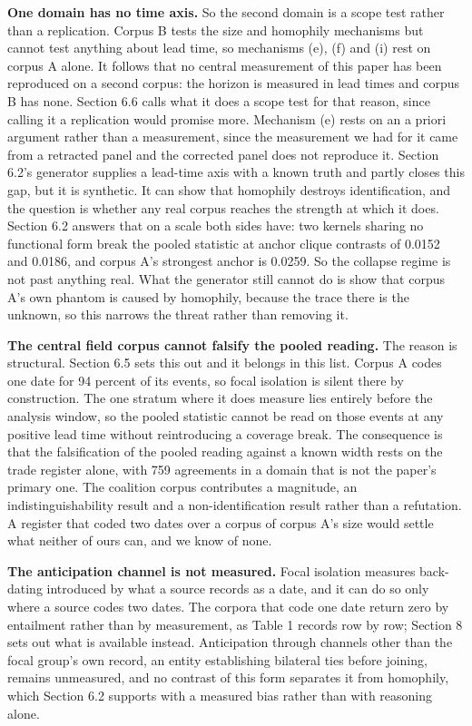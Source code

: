 \documentclass[twoside,11pt]{article}
\begin{document}
\textbf{One domain has no time axis.} So the second domain is a scope test rather than a replication. Corpus B tests the size and homophily mechanisms but cannot test anything about lead time, so mechanisms (e), (f) and (i) rest on corpus A alone. It follows that no central measurement of this paper has been reproduced on a second corpus: the horizon is measured in lead times and corpus B has none. Section 6.6 calls what it does a scope test for that reason, since calling it a replication would promise more. Mechanism (e) rests on an a priori argument rather than a measurement, since the measurement we had for it came from a retracted panel and the corrected panel does not reproduce it. Section 6.2's generator supplies a lead-time axis with a known truth and partly closes this gap, but it is synthetic. It can show that homophily destroys identification, and the question is whether any real corpus reaches the strength at which it does. Section 6.2 answers that on a scale both sides have: two kernels sharing no functional form break the pooled statistic at anchor clique contrasts of 0.0152 and 0.0186, and corpus A's strongest anchor is 0.0259. So the collapse regime is not past anything real. What the generator still cannot do is show that corpus A's own phantom is caused by homophily, because the trace there is the unknown, so this narrows the threat rather than removing it.

\textbf{The central field corpus cannot falsify the pooled reading.} The reason is structural. Section 6.5 sets this out and it belongs in this list. Corpus A codes one date for 94 percent of its events, so focal isolation is silent there by construction. The one stratum where it does measure lies entirely before the analysis window, so the pooled statistic cannot be read on those events at any positive lead time without reintroducing a coverage break. The consequence is that the falsification of the pooled reading against a known width rests on the trade register alone, with 759 agreements in a domain that is not the paper's primary one. The coalition corpus contributes a magnitude, an indistinguishability result and a non-identification result rather than a refutation. A register that coded two dates over a corpus of corpus A's size would settle what neither of ours can, and we know of none.

\textbf{The anticipation channel is not measured.} Focal isolation measures back-dating introduced by what a source records as a date, and it can do so only where a source codes two dates. The corpora that code one date return zero by entailment rather than by measurement, as Table 1 records row by row; Section 8 sets out what is available instead. Anticipation through channels other than the focal group's own record, an entity establishing bilateral ties before joining, remains unmeasured, and no contrast of this form separates it from homophily, which Section 6.2 supports with a measured bias rather than with reasoning alone.
\end{document}
